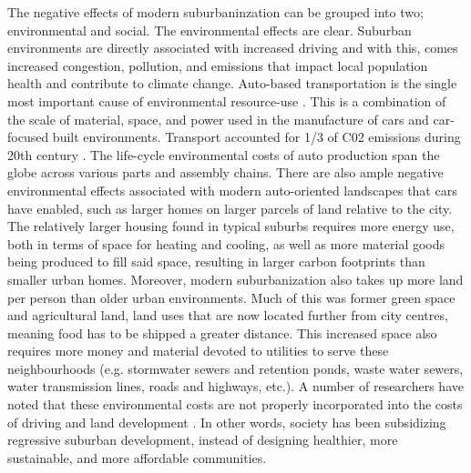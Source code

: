 The negative effects of modern suburbaninzation can be grouped into two; environmental and social. The environmental effects are clear. Suburban environments are directly associated with increased driving \cite{ewing_travel_2010,moos_suburban_2015} and with this, comes increased congestion, pollution, and emissions that impact local population health and contribute to climate change. Auto-based transportation is the single most important cause of environmental resource-use \cite{urry_systemautomobility_2004}. This is a combination of the scale of material, space, and power used in the manufacture of cars and car-focused built environments. Transport accounted for 1/3 of C02 emissions during 20th century \cite{urry_systemautomobility_2004}. The life-cycle environmental costs of auto production span the globe across various parts and assembly chains. There are also ample negative environmental effects associated with modern auto-oriented landscapes that cars have enabled, such as larger homes on larger parcels of land relative to the city. The relatively larger housing found in typical suburbs requires more energy use, both in terms of space for heating and cooling, as well as more material goods being produced to fill said space, resulting in larger carbon footprints than smaller urban homes. Moreover, modern suburbanization also takes up more land per person than older urban environments. Much of this was former green space and agricultural land, land uses that are now located further from city centres, meaning food has to be shipped a greater distance. This increased space also requires more money and material devoted to utilities to serve these neighbourhoods (e.g. stormwater sewers and retention ponds, waste water sewers, water transmission lines, roads and highways, etc.). A number of researchers have noted that these environmental costs are not properly incorporated into the costs of driving and land development \cite{blais_perverse_2011,ewing_compactness_2015,kunstler_geography_1994}. In other words, society has been subsidizing regressive suburban development, instead of designing healthier, more sustainable, and more affordable communities.

